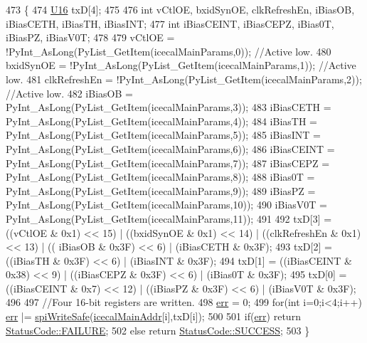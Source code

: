 \begin{DoxyCode}
473 \{                            
474     \hyperlink{ICECALv3_8h_adf928e51a60dba0df29d615401cc55a8}{U16} txD[4];
475 
476     \textcolor{keywordtype}{int} vCtlOE, bxidSynOE, clkRefreshEn, iBiasOB, iBiasCETH, iBiasTH, iBiasINT;
477     \textcolor{keywordtype}{int} iBiasCEINT, iBiasCEPZ, iBias0T, iBiasPZ, iBiasV0T;
478     
479     vCtlOE              = !PyInt\_AsLong(PyList\_GetItem(icecalMainParams,0));    \textcolor{comment}{//Active low.}
480     bxidSynOE       = !PyInt\_AsLong(PyList\_GetItem(icecalMainParams,1));    \textcolor{comment}{//Active low.}
481     clkRefreshEn    = !PyInt\_AsLong(PyList\_GetItem(icecalMainParams,2));    \textcolor{comment}{//Active low.}
482     iBiasOB         = PyInt\_AsLong(PyList\_GetItem(icecalMainParams,3));
483     iBiasCETH           = PyInt\_AsLong(PyList\_GetItem(icecalMainParams,4));
484     iBiasTH             = PyInt\_AsLong(PyList\_GetItem(icecalMainParams,5));
485     iBiasINT            = PyInt\_AsLong(PyList\_GetItem(icecalMainParams,6));
486     iBiasCEINT      = PyInt\_AsLong(PyList\_GetItem(icecalMainParams,7));
487     iBiasCEPZ       = PyInt\_AsLong(PyList\_GetItem(icecalMainParams,8));
488     iBias0T             = PyInt\_AsLong(PyList\_GetItem(icecalMainParams,9));
489     iBiasPZ             = PyInt\_AsLong(PyList\_GetItem(icecalMainParams,10));
490     iBiasV0T        = PyInt\_AsLong(PyList\_GetItem(icecalMainParams,11));
491 
492     txD[3] = ((vCtlOE & 0x1) << 15)         | ((bxidSynOE & 0x1) << 14) | ((clkRefreshEn & 0x1) << 13) | ((
      iBiasOB & 0x3F) << 6) | (iBiasCETH & 0x3F);
493     txD[2] = ((iBiasTH & 0x3F) << 6)        |  (iBiasINT  & 0x3F); 
494     txD[1] = ((iBiasCEINT & 0x38) << 9) | ((iBiasCEPZ & 0x3F) << 6) |  (iBias0T      & 0x3F);
495     txD[0] = ((iBiasCEINT & 0x7) << 12) | ((iBiasPZ   & 0x3F) << 6) |  (iBiasV0T     & 0x3F);
496 
497     \textcolor{comment}{//Four 16-bit registers are written.}
498     \hyperlink{classICECALv3_ad8989925ee5b3ff322d863ce6aaff0bd}{err} = 0;
499     \textcolor{keywordflow}{for}(\textcolor{keywordtype}{int} i=0;i<4;i++) \hyperlink{classICECALv3_ad8989925ee5b3ff322d863ce6aaff0bd}{err} |= \hyperlink{classICECALv3_aa0b8358ea0be8e47a8aded5e1551787f}{spiWriteSafe}(\hyperlink{ICECALv3_8h_a9c22ae782814495416dc2b803df326c1}{icecalMainAddr}[i],txD[i]);
500 
501     \textcolor{keywordflow}{if}(\hyperlink{classICECALv3_ad8989925ee5b3ff322d863ce6aaff0bd}{err}) \textcolor{keywordflow}{return} \hyperlink{classStatusCode_a6f565cbeadc76d14c72f047e5e85eb4ba3da73d4c469762eb9d3c960368252b26}{StatusCode::FAILURE};
502     \textcolor{keywordflow}{else}        \textcolor{keywordflow}{return} \hyperlink{classStatusCode_a6f565cbeadc76d14c72f047e5e85eb4badd0da38d3ba0d922efd1f4619bc37ad8}{StatusCode::SUCCESS};
503 \}
\end{DoxyCode}
\mbox{\label{classObject_ae30fea75683c2d149b6b6d17c09ecd0c}} 
